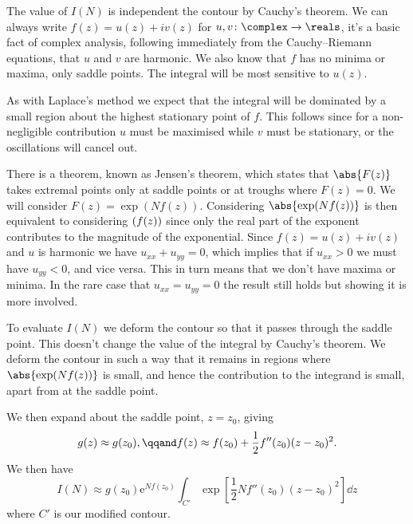 \documentclass[fleqn]{NotesClass}
\newcommand*{\e}{\mathrm{e}}
\let\Re\relax
\DeclareMathOperator{\Re}{Re}
\begin{document}
    The value of \(I(N)\) is independent the contour by Cauchy's theorem.
    We can always write \(f(z) = u(z) + iv(z)\) for \(u, v \colon \complex \to \reals\), it's a basic fact of complex analysis, following immediately from the Cauchy--Riemann equations, that \(u\) and \(v\) are harmonic.
    We also know that \(f\) has no minima or maxima, only saddle points.
    The integral will be most sensitive to \(u(z)\).
    
    As with Laplace's method we expect that the integral will be dominated by a small region about the highest stationary point of \(f\).
    This follows since for a non-negligible contribution \(u\) must be maximised while \(v\) must be stationary, or the oscillations will cancel out.
    
    There is a theorem, known as Jensen's theorem, which states that \(\abs{F(z)}\) takes extremal points only at saddle points or at troughs where \(F(z) = 0\).
    We will consider \(F(z) = \exp(Nf(z))\).
    Considering \(\abs{\exp(Nf(z))}\) is then equivalent to considering \(\Re(f(z))\) since only the real part of the exponent contributes to the magnitude of the exponential.
    Since \(f(z) = u(z) + iv(z)\) and \(u\) is harmonic we have \(u_{xx} + u_{yy} = 0\), which implies that if \(u_{xx} > 0\) we must have \(u_{yy} < 0\), and vice versa.
    This in turn means that we don't have maxima or minima.
    In the rare case that \(u_{xx} = u_{yy} = 0\) the result still holds but showing it is more involved.
    
    To evaluate \(I(N)\) we deform the contour so that it passes through the saddle point.
    This doesn't change the value of the integral by Cauchy's theorem.
    We deform the contour in such a way that it remains in regions where \(\abs{\exp(Nf(z))}\) is small, and hence the contribution to the integrand is small, apart from at the saddle point.
    
    We then expand about the saddle point, \(z = z_0\), giving
    \begin{equation}
        g(z) \approx g(z_0), \qqand f(z) \approx f(z_0) + \frac{1}{2}f''(z_0)(z - z_0)^2.
    \end{equation}
    We then have
    \begin{equation}
        I(N) \approx g(z_0) \e^{Nf(z_0)} \int_{C'} \exp\left[ \frac{1}{2}Nf''(z_0)(z - z_0)^2 \right]\dd{z}
    \end{equation}
    where \(C'\) is our modified contour.
    
\end{document}
